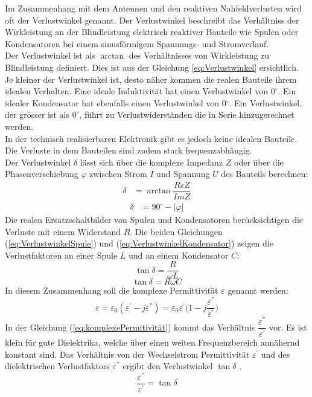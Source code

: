Im Zusammenhang mit dem Antennen und den reaktiven Nahfeldverlusten wird oft der Verlustwinkel genannt. Der Verlustwinkel beschreibt das Verhältniss der Wirkleistung an der Blindleistung elektrisch reaktiver Bauteile wie Spulen oder Kondensatoren bei einem sinusförmigem Spannungs- und Stromverlauf.\\
Der Verlustwinkel ist als $\arctan$ des Verhältnisses von Wirkleistung zu Blindleistung definiert. Dies ist aus der Gleichung \ref{eq:Verlustwinkel} ersichtlich. 
Je kleiner der Verlustwinkel ist, desto näher kommen die realen Bauteile ihrem idealen Verhalten. Eine ideale Induktivität hat einen Verlustwinkel von $0^\circ$. Ein idealer Kondensator hat ebenfalls einen Verlustwinkel von 0$^\circ$. Ein Verlustwinkel, der grösser ist als $0^\circ$, führt zu Verlustwiderständen die in Serie hinzugerechnet werden.\\
In der technisch realisierbaren Elektronik gibt es jedoch keine idealen Bauteile. Die Verluste in dem Bauteilen sind zudem stark frequenzabhängig.\\
Der Verlustwinkel $\delta$ lässt sich über die komplexe Impedanz $Z$ oder über die Phasenverschiebung $\varphi$ zwischen Strom $I$ und Spannung $U$ des Bauteils berechnen: 
\begin{align}
\label{eq:Verlustwinkel}
\delta &= \arctan \dfrac{ReZ}{ImZ}
\end{align}
\begin{align}
\label{eq:Verlustwinkel_aus_Phi}
\delta &= 90^\circ - |\varphi|
\end{align}
Die realen Ersatzschaltbilder von Spulen und Kondensatoren berücksichtigen die Verluste mit einem Widerstand $R$.
Die beiden Gleichungen (\ref{eq:VerlustwinkelSpule}) und (\ref{eq:VerlustwinkelKondensator}) zeigen die Verlustfaktoren an einer Spule $L$ und an einem Kondensator $C$:
\begin{equation}\label{eq:VerlustwinkelSpule}
\tan \delta = \dfrac{R}{\omega L}
\end{equation}
\begin{equation} \label{eq:VerlustwinkelKondensator}
\tan \delta = R \omega C
\end{equation}
In diesem Zusammenhang soll die komplexe Permittivität $\varepsilon$ genannt werden:
\begin{equation} \label{eq:komplexePermitivität}
\varepsilon=\varepsilon_0(\varepsilon^{'}-j\varepsilon^{''})=\varepsilon_0\varepsilon^{'}\big(1-j\dfrac{\varepsilon^{''}}{\varepsilon^{'}}\big)
\end{equation}
In der Gleichung (\ref{eq:komplexePermitivität}) kommt das Verhältnis $\dfrac{\varepsilon^{''}}{\varepsilon^{'}}$ vor. Es ist klein für gute Dielektrika, welche über einen weiten Frequenzbereich annähernd konstant sind. Das Verhältnis von der Wechselstrom Permittivität $\varepsilon^{'}$ und des dielektrischen Verlustfaktors $\varepsilon^{''}$ ergibt den Verlustwinkel $\tan\delta$ \cite{elliott1981antenna}. 
\begin{equation} \label{eq:VerlustwinkelEpsilonPermitivität}
\dfrac{\varepsilon^{''}}{\varepsilon^{'}}=\tan\delta
\end{equation}


